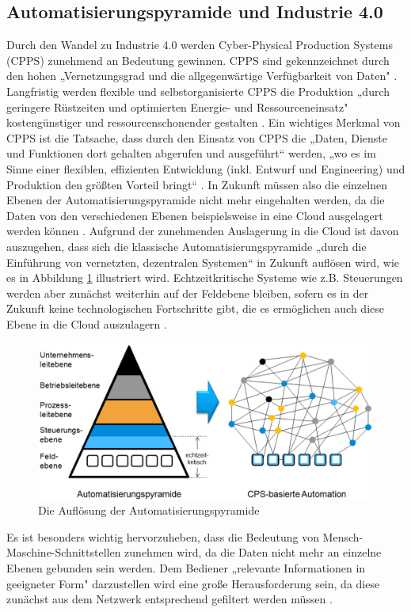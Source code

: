 \subsection{Automatisierungspyramide und Industrie 4.0}\label{sec:AutomatisierungspyramideUndIndustrie4.0}
Durch den Wandel zu Industrie 4.0 werden Cyber-Physical Production Systems (CPPS) zunehmend an Bedeutung gewinnen. CPPS sind gekennzeichnet durch den hohen „Vernetzungsgrad und die allgegenwärtige Verfügbarkeit von Daten" \cite[S.3]{17}. Langfristig werden flexible und selbstorganisierte CPPS die Produktion „durch geringere Rüstzeiten und optimierten Energie- und Ressourceneinsatz" \cite[S.3]{17} kostengünstiger und ressourcenschonender gestalten \cite[S.3]{17}.
\newpage
\noindent Ein wichtiges Merkmal von CPPS ist die Tatsache, dass durch den Einsatz von CPPS die „Daten, Dienste und Funktionen dort gehalten abgerufen und ausgeführt“ \cite[S.4]{17} werden, „wo es im Sinne einer flexiblen, effizienten Entwicklung (inkl. Entwurf und Engineering) und Produktion den größten Vorteil bringt“ \cite[S.4]{17}. In Zukunft müssen also die einzelnen Ebenen der Automatisierungspyramide nicht mehr eingehalten werden, da die Daten von den verschiedenen Ebenen beispielsweise in eine Cloud ausgelagert werden können \cite[S.4]{17}.
\newline
Aufgrund der zunehmenden Auslagerung in die Cloud ist davon auszugehen, dass sich die klassische Automatisierungspyramide „durch die Einführung von vernetzten, dezentralen Systemen“ \cite[S.4]{17} in Zukunft auflösen wird, wie es in Abbildung \ref{fig:AutomatisierungspyramideCPPS} illustriert wird. Echtzeitkritische Systeme wie z.B. Steuerungen werden aber zunächst weiterhin auf der Feldebene bleiben, sofern es in der Zukunft keine technologischen Fortschritte gibt, die es ermöglichen auch diese Ebene in die Cloud auszulagern \cite[S.4]{17}.
\begin{figure}[h]
	\centering
	\includegraphics[width=1\linewidth]{Bilder/A10_AutomatisierungspyramideCPPS}
	\caption{Die Auflösung der Automatisierungspyramide \cite[S.4]{17}}
	\label{fig:AutomatisierungspyramideCPPS}
\end{figure}
\newline
\noindent Es ist besonders wichtig hervorzuheben, dass die Bedeutung von Mensch-Maschine-Schnittstellen zunehmen wird, da die Daten nicht mehr an einzelne Ebenen gebunden sein werden. Dem Bediener „relevante Informationen in geeigneter Form" \cite[S.4]{17} darzustellen wird eine große Herausforderung sein, da diese zunächst aus dem Netzwerk entsprechend gefiltert werden müssen \cite[S.4]{17}.

